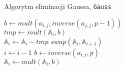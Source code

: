 \documentclass[]{article}
\begin{document}
		\begin{algorithm}[H]
			\SetAlgoLined
			\label{Gauss}
			\caption{Algorytm eliminacji Gaussa, \texttt{Gauss}}
			{
				{
					{
						{
							\(b \gets mult(a_{i,j}, inverse(a_{j,j}, p-1))\) \\
							\(tmp \gets mult(\mathbb{A}_i, b)\) \\
							\(\mathbb{A}_i \gets \mathbb{A}_i - tmp\)
						}
						\Else
						{
							\(swap(\mathbb{A}_i, \mathbb{A}_{i+1})\) \\
							\(i \gets i - 1\)
						}
					}
				}
			}
			{
				{
					\(b \gets inverse(a_{i,i}, p)\) \\
					\(\mathbb{A}_i \gets mult(\mathbb{A}_i, b)\) \\
				}
				\Else
				{
				}
			}
		\end{algorithm}
			
	
	
\end{document}
